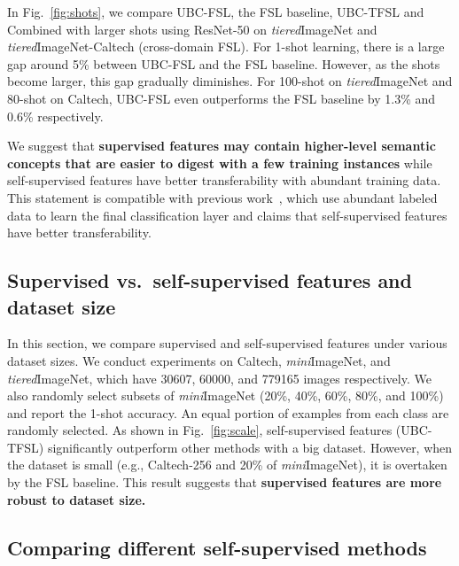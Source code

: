 \documentclass[final]{cvpr}
\newcommand{\subsecvspace}{\vspace{-0.0em}}
\begin{document}
In Fig.~\ref{fig:shots}, we compare UBC-FSL, the FSL baseline, UBC-TFSL and Combined with larger shots using ResNet-50 on \emph{tiered}ImageNet and \emph{tiered}ImageNet-Caltech (cross-domain FSL). For 1-shot learning, there is a large gap around 5\% between UBC-FSL and the FSL baseline. However, as the shots become larger, this gap gradually diminishes. For 100-shot on \emph{tiered}ImageNet and 80-shot on Caltech, UBC-FSL even outperforms the FSL baseline by 1.3\% and
0.6\% respectively. 

We suggest that \textbf{supervised features may contain higher-level semantic concepts that are easier to digest with a few training instances} while {self-supervised features have better transferability with abundant training data}. This statement is compatible with previous work~\cite{he2020momentum}, which use abundant labeled data to learn the final classification layer and claims that self-supervised features have better transferability.




\subsecvspace
\subsection{Supervised vs.~self-supervised features and dataset size}
\subsecvspace
\label{size}



In this section, we compare supervised and self-supervised features under various dataset sizes. We conduct experiments on Caltech, \emph{mini}ImageNet, and \emph{tiered}ImageNet, which have 30607, 60000, and 779165 images respectively. We also randomly select subsets of \emph{mini}ImageNet (20\%, 40\%, 60\%, 80\%, and 100\%) and report the 1-shot accuracy. An equal portion of examples from each class are randomly selected.
As shown in Fig.~\ref{fig:scale}, self-supervised features (UBC-TFSL) significantly outperform other methods with a big dataset. However, when the dataset is small (e.g., Caltech-256 and 20\% of \emph{mini}ImageNet), it is overtaken by the FSL baseline.
This result suggests that \textbf{supervised features are more robust to dataset size.} 





 



\subsecvspace
\subsection{Comparing different self-supervised methods}
\subsecvspace
\label{selfmethods}
\end{document}
